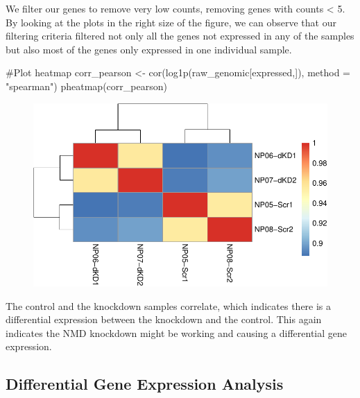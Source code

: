 \documentclass[
  letterpaper,
  DIV=11,
  numbers=noendperiod]{scrartcl}
\newenvironment{Shaded}{\begin{snugshade}}{\end{snugshade}}
\newcommand{\AttributeTok}[1]{\textcolor[rgb]{0.40,0.45,0.13}{#1}}
\newcommand{\CommentTok}[1]{\textcolor[rgb]{0.37,0.37,0.37}{#1}}
\newcommand{\FunctionTok}[1]{\textcolor[rgb]{0.28,0.35,0.67}{#1}}
\newcommand{\NormalTok}[1]{\textcolor[rgb]{0.00,0.23,0.31}{#1}}
\newcommand{\OtherTok}[1]{\textcolor[rgb]{0.00,0.23,0.31}{#1}}
\newcommand{\StringTok}[1]{\textcolor[rgb]{0.13,0.47,0.30}{#1}}
\begin{document}
We filter our genes to remove very low counts, removing genes with
counts \textless{} 5. By looking at the plots in the right size of the
figure, we can observe that our filtering criteria filtered not only all
the genes not expressed in any of the samples but also most of the genes
only expressed in one individual sample.

\begin{Shaded}
\begin{Highlighting}[]
\CommentTok{\#Plot heatmap}
\NormalTok{corr\_pearson }\OtherTok{\textless{}{-}} \FunctionTok{cor}\NormalTok{(}\FunctionTok{log1p}\NormalTok{(raw\_genomic[expressed,]), }\AttributeTok{method =} \StringTok{"spearman"}\NormalTok{)}
\FunctionTok{pheatmap}\NormalTok{(corr\_pearson)}
\end{Highlighting}
\end{Shaded}

\begin{figure}[H]

{\centering \includegraphics{intro-STAT-GroupProject_files/figure-pdf/unnamed-chunk-9-1.pdf}

}

\end{figure}

The control and the knockdown samples correlate, which indicates there
is a differential expression between the knockdown and the control. This
again indicates the NMD knockdown might be working and causing a
differential gene expression.

\hypertarget{differential-gene-expression-analysis}{%
\subsection{Differential Gene Expression
Analysis}\label{differential-gene-expression-analysis}}
\end{document}
